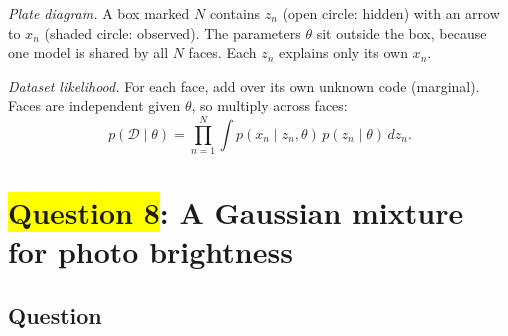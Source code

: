 \documentclass[12pt,a4paper]{article}
\begin{document}
\emph{Plate diagram.} A box marked $N$ contains $z_n$ (open circle: hidden) with an arrow to $x_n$ (shaded circle: observed). The parameters $\theta$ sit outside the box, because one model is shared by all $N$ faces. Each $z_n$ explains only its own $x_n$.

\emph{Dataset likelihood.} For each face, add over its own unknown code (marginal). Faces are independent given $\theta$, so multiply across faces:
\[
p(\mathcal{D}\mid\theta)=\prod_{n=1}^{N}\int p(x_n\mid z_n,\theta)\,p(z_n\mid\theta)\,dz_n .
\]
\newpage
\section{\texorpdfstring{\colorbox{yellow}{Question 8}}{Question 8}: A Gaussian mixture for photo brightness}

\subsection{Question}
\end{document}
